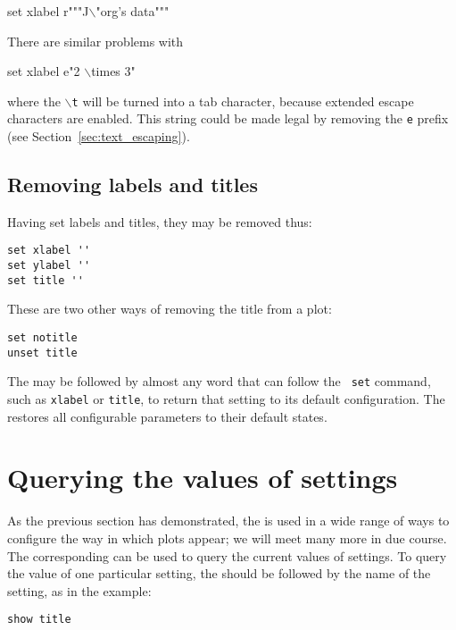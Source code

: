 \begin{dodo}
set xlabel r"""J$\backslash$"org's data"""
\end{dodo}

There are similar problems with

\begin{dontdo}
set xlabel e"2 $\backslash$times 3"
\end{dontdo}

\noindent where the \texttt{$\backslash$t} will be turned into a tab character,
because extended escape characters are enabled. This string could be made legal
by removing the {\tt e} prefix (see Section~\ref{sec:text_escaping}).

\subsection{Removing labels and titles}

Having set labels and titles, they may be removed thus:

\begin{verbatim}
set xlabel ''
set ylabel ''
set title ''
\end{verbatim}

\noindent These are two other ways of removing the title from a plot:

\begin{verbatim}
set notitle
unset title
\end{verbatim}

The  may be followed by almost any word that can follow the {\tt
set} command, such as {\tt xlabel} or {\tt title}, to return that setting to
its default configuration. The  restores all configurable
parameters to their default states.

\section{Querying the values of settings}

As the previous section has demonstrated, the  is used in a wide
range of ways to configure the way in which plots appear; we will meet many
more in due course. The corresponding  can be used to query the
current values of settings. To query the value of one particular setting, the
 should be followed by the name of the setting, as in the
example:

\begin{verbatim}
show title
\end{verbatim}

